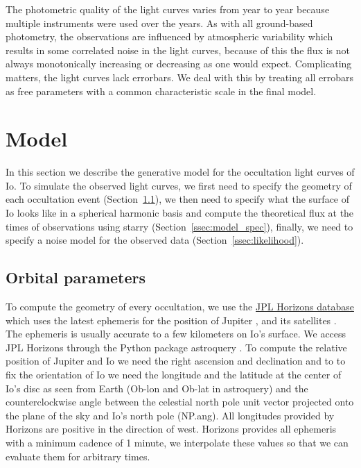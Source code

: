 \documentclass[modern]{aastex62}
\begin{document}
The photometric quality of the light curves varies from year to year because multiple instruments were used over the years. 
As with all ground-based photometry, the observations are influenced by atmospheric variability which results in some correlated noise in the light curves, because of this the flux is not always monotonically increasing or decreasing as one would expect.
Complicating matters, the light curves lack errorbars. 
We deal with this by treating all errobars as free parameters with a common characteristic scale in the final model.

\section{Model}
\label{sec:model}
In this section we describe the generative model for the occultation light curves of Io.
To simulate the observed light curves, we first need to specify the geometry of each occultation event (Section~\ref{ssec:orbital_parameters}), we then need to specify what the surface of Io looks like in a spherical harmonic basis and compute the theoretical flux at the times of observations using \textsf{starry} (Section~\ref{ssec:model_spec}), finally, we need to specify a noise model for the observed data (Section~\ref{ssec:likelihood}).

\subsection{Orbital parameters}
\label{ssec:orbital_parameters}
To compute the geometry of every occultation, we use the \href{https://ssd.jpl.nasa.gov/horizons.cgi}{JPL Horizons database} which uses the latest ephemeris for the position of Jupiter \citep{folkner2014}, and its satellites \citep{jacobson2015}.
The ephemeris is usually accurate to a few kilometers on Io's surface.
We access JPL Horizons through the Python package \textsf{astroquery} \citep{ginsburg2019}.
To compute the relative position of Jupiter and Io we need the right ascension and declination and to to fix the orientation of Io we need the longitude and the latitude at the center of Io's disc as seen from Earth (\textsf{Ob-lon} and \textsf{Ob-lat} in \textsf{astroquery}) and the counterclockwise angle between the celestial north pole unit vector projected onto the plane of the sky and Io's north pole (\textsf{NP.ang}).
All longitudes provided by Horizons are positive  in the direction of west.
Horizons provides all ephemeris with a minimum cadence of 1 minute, we interpolate these values so that we can evaluate them for arbitrary times.
\end{document}
